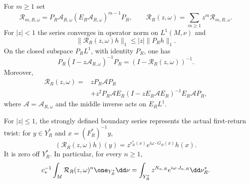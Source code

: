 \begin{theorem}
\label{thm:common-renewal}
For $m\ge1$ set
\begin{equation}\label{eq:first-return-operator}
 \mathcal R_{m,R,\omega}
 =P_R\mathcal A_{R,\omega}
       (E_R\mathcal A_{R,\omega})^{m-1}P_R,
 \qquad
 \mathcal R_R(z,\omega)=\sum_{m\ge1}z^m\mathcal R_{m,R,\omega}.
\end{equation}
For $|z|<1$ the series converges in operator norm on $L^1(M,\nu)$ and
\begin{equation}\label{eq:induced-damped-bound}
 \|\mathcal R_R(z,\omega)h\|_1\le |z|\|P_Rh\|_1.
\end{equation}
On the closed subspace $P_RL^1$, with identity $P_R$, one has
\begin{equation}\label{eq:physical-renewal-identity}
 P_R(I-z\mathcal A_{R,\omega})^{-1}P_R
       =(I-\mathcal R_R(z,\omega))^{-1}.
\end{equation}
Moreover,
\begin{equation}\label{eq:schur-return-operator}
 \begin{split}
 \mathcal R_R(z,\omega)={}&zP_R\mathcal A P_R\\
 &+z^2P_R\mathcal A E_R
 (I-zE_R\mathcal A E_R)^{-1}
             E_R\mathcal A P_R,
 \end{split}
\end{equation}
where $\mathcal A=\mathcal A_{R,\omega}$ and the middle inverse acts
on $E_R L^1$.

For $|z|\le1$, the strongly defined boundary series represents the
actual first-return twist: for $y\in Y_R^*$ and $x=(F_R^*)^{-1}y$,
\begin{equation}\label{eq:actual-induced-realization}
 (\mathcal R_R(z,\omega)h)(y)
       =z^{r_R^*(x)}e^{i\omega\cdot G_R(x)}h(x).
\end{equation}
It is zero off $Y_R^*$. In particular, for every $n\ge1$,
\begin{equation}\label{eq:actual-record-pairing}
 c_*^{-1}\int_M\mathcal R_R(z,\omega)^n\one_{Y_R^*}\dd\nu
       =\int_{Y_R^*}z^{N_{n,R}}e^{i\omega\cdot J_{n,R}}\dd\nu_R^*.
\end{equation}
\end{theorem}
